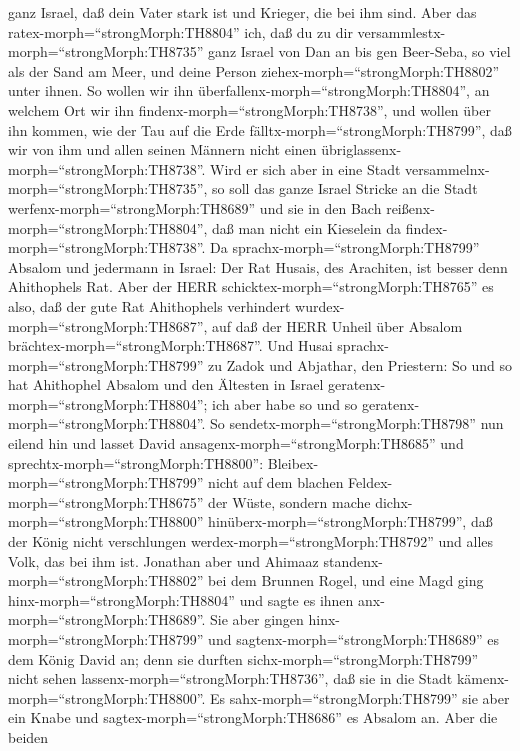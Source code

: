 ganz Israel, daß dein Vater stark ist und Krieger, die bei ihm sind.
 Aber das ratex-morph=``strongMorph:TH8804'' ich, daß du zu
dir versammlestx-morph=``strongMorph:TH8735'' ganz Israel von Dan an bis
gen Beer-Seba, so viel als der Sand am Meer, und deine Person
ziehex-morph=``strongMorph:TH8802'' unter ihnen.  So wollen
wir ihn überfallenx-morph=``strongMorph:TH8804'', an welchem Ort wir ihn
findenx-morph=``strongMorph:TH8738'', und wollen über ihn kommen, wie
der Tau auf die Erde fälltx-morph=``strongMorph:TH8799'', daß wir von
ihm und allen seinen Männern nicht einen
übriglassenx-morph=``strongMorph:TH8738''.  Wird er sich
aber in eine Stadt versammelnx-morph=``strongMorph:TH8735'', so soll das
ganze Israel Stricke an die Stadt werfenx-morph=``strongMorph:TH8689''
und sie in den Bach reißenx-morph=``strongMorph:TH8804'', daß man nicht
ein Kieselein da findex-morph=``strongMorph:TH8738''.  Da
sprachx-morph=``strongMorph:TH8799'' Absalom und jedermann in Israel:
Der Rat Husais, des Arachiten, ist besser denn Ahithophels Rat. Aber der
HERR schicktex-morph=``strongMorph:TH8765'' es also, daß der gute Rat
Ahithophels verhindert wurdex-morph=``strongMorph:TH8687'', auf daß der
HERR Unheil über Absalom brächtex-morph=``strongMorph:TH8687''.
 Und Husai sprachx-morph=``strongMorph:TH8799'' zu Zadok
und Abjathar, den Priestern: So und so hat Ahithophel Absalom und den
Ältesten in Israel geratenx-morph=``strongMorph:TH8804''; ich aber habe
so und so geratenx-morph=``strongMorph:TH8804''.  So
sendetx-morph=``strongMorph:TH8798'' nun eilend hin und lasset David
ansagenx-morph=``strongMorph:TH8685'' und
sprechtx-morph=``strongMorph:TH8800'':
Bleibex-morph=``strongMorph:TH8799'' nicht auf dem blachen
Feldex-morph=``strongMorph:TH8675'' der Wüste, sondern mache
dichx-morph=``strongMorph:TH8800''
hinüberx-morph=``strongMorph:TH8799'', daß der König nicht verschlungen
werdex-morph=``strongMorph:TH8792'' und alles Volk, das bei ihm ist.
 Jonathan aber und Ahimaaz
standenx-morph=``strongMorph:TH8802'' bei dem Brunnen Rogel, und eine
Magd ging hinx-morph=``strongMorph:TH8804'' und sagte es ihnen
anx-morph=``strongMorph:TH8689''. Sie aber gingen
hinx-morph=``strongMorph:TH8799'' und
sagtenx-morph=``strongMorph:TH8689'' es dem König David an; denn sie
durften sichx-morph=``strongMorph:TH8799'' nicht sehen
lassenx-morph=``strongMorph:TH8736'', daß sie in die Stadt
kämenx-morph=``strongMorph:TH8800''.  Es
sahx-morph=``strongMorph:TH8799'' sie aber ein Knabe und
sagtex-morph=``strongMorph:TH8686'' es Absalom an. Aber die beiden

